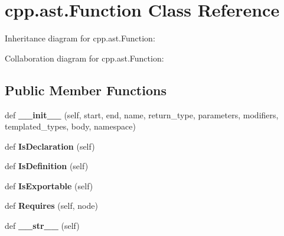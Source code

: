 \hypertarget{classcpp_1_1ast_1_1Function}{}\section{cpp.\+ast.\+Function Class Reference}
\label{classcpp_1_1ast_1_1Function}


Inheritance diagram for cpp.\+ast.\+Function\+:


Collaboration diagram for cpp.\+ast.\+Function\+:
\subsection*{Public Member Functions}
\begin{DoxyCompactItemize}
\item 
\mbox{\label{classcpp_1_1ast_1_1Function_ab5270f5d353ec5e9dcd136e4cc6c7f6c}} 
def {\bfseries \+\_\+\+\_\+init\+\_\+\+\_\+} (self, start, end, name, return\+\_\+type, parameters, modifiers, templated\+\_\+types, body, namespace)
\item 
\mbox{\label{classcpp_1_1ast_1_1Function_ab9120d9a774eb5860d220b3bcdcaa87e}} 
def {\bfseries Is\+Declaration} (self)
\item 
\mbox{\label{classcpp_1_1ast_1_1Function_ad5d96144bd8418ac72332bffb21ea86f}} 
def {\bfseries Is\+Definition} (self)
\item 
\mbox{\label{classcpp_1_1ast_1_1Function_a85a073cd69116bc6191f379d69d10d72}} 
def {\bfseries Is\+Exportable} (self)
\item 
\mbox{\label{classcpp_1_1ast_1_1Function_a999e7b5e43517cd4d68b1aeea8a7d6e1}} 
def {\bfseries Requires} (self, node)
\item 
\mbox{\label{classcpp_1_1ast_1_1Function_aaef91d6a3b1eb2703eebb32d39c45978}} 
def {\bfseries \+\_\+\+\_\+str\+\_\+\+\_\+} (self)
\end{DoxyCompactItemize}
